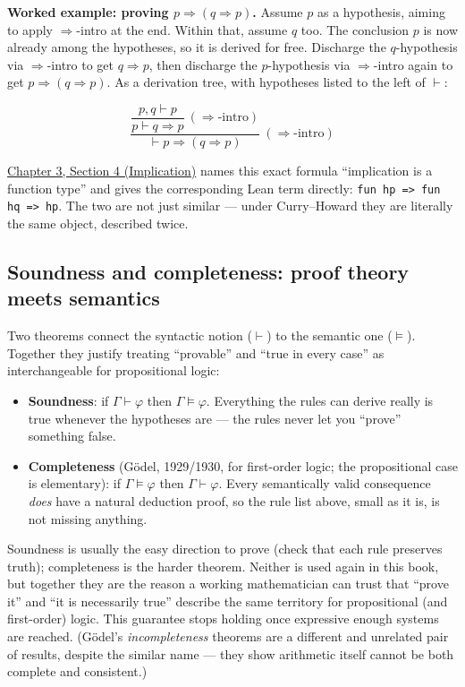 \textbf{Worked example: proving \(p \Rightarrow (q \Rightarrow p)\).} Assume \(p\) as a hypothesis, aiming to apply \(\Rightarrow\)-intro at the end. Within that, assume \(q\) too. The conclusion \(p\) is now already among the hypotheses, so it is derived for free. Discharge the \(q\)-hypothesis via \(\Rightarrow\)-intro to get \(q \Rightarrow p\), then discharge the \(p\)-hypothesis via \(\Rightarrow\)-intro again to get \(p \Rightarrow (q \Rightarrow p)\). As a derivation tree, with hypotheses listed to the left of \(\vdash\):

\[
\dfrac{\dfrac{p, q \vdash p}{p \vdash q \Rightarrow p}\ (\Rightarrow\text{-intro})}
{\vdash p \Rightarrow (q \Rightarrow p)}\ (\Rightarrow\text{-intro})
\]

\hyperref[sec:03-propositions-and-proofs:04-implication:1]{Chapter 3, Section 4 (Implication)} names this exact formula ``implication is a function type'' and gives the corresponding Lean term directly: \texttt{fun hp => fun hq => hp}. The two are not just similar --- under Curry--Howard they are literally the same object, described twice.

\subsection{Soundness and completeness: proof theory meets semantics}\label{sec:03-propositions-and-proofs:02-logic-recap:5}

Two theorems connect the syntactic notion (\(\vdash\)) to the semantic one (\(\models\)). Together they justify treating ``provable'' and ``true in every case'' as interchangeable for propositional logic:

\begin{itemize}
\tightlist
\item
  \textbf{Soundness}: if \(\Gamma \vdash \varphi\) then \(\Gamma \models \varphi\). Everything the rules can derive really is true whenever the hypotheses are --- the rules never let you ``prove'' something false.
\item
  \textbf{Completeness} (Gödel, 1929/1930, for first-order logic; the propositional case is elementary): if \(\Gamma \models \varphi\) then \(\Gamma \vdash
  \varphi\). Every semantically valid consequence \emph{does} have a natural deduction proof, so the rule list above, small as it is, is not missing anything.
\end{itemize}

Soundness is usually the easy direction to prove (check that each rule preserves truth); completeness is the harder theorem. Neither is used again in this book, but together they are the reason a working mathematician can trust that ``prove it'' and ``it is necessarily true'' describe the same territory for propositional (and first-order) logic. This guarantee stops holding once expressive enough systems are reached. (Gödel's \emph{incompleteness} theorems are a different and unrelated pair of results, despite the similar name --- they show arithmetic itself cannot be both complete and consistent.)


